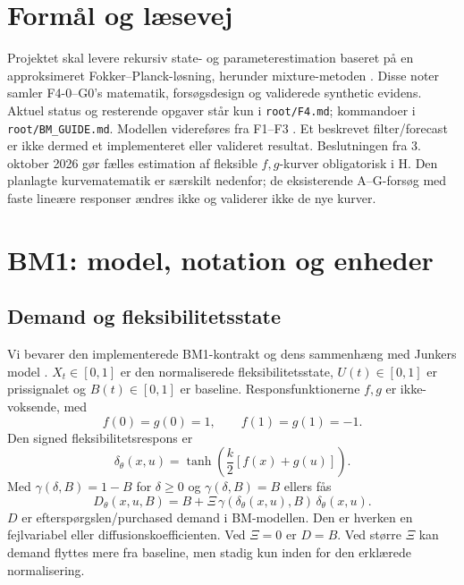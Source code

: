 \section{Formål og læsevej}
Projektet skal levere rekursiv state- og parameterestimation baseret på en
approksimeret Fokker--Planck-løsning, herunder mixture-metoden \cite{project}.
Disse noter samler F4-0--G0's matematik, forsøgsdesign og validerede synthetic evidens. Aktuel status og
resterende opgaver står kun i \texttt{root/F4.md}; kommandoer i \texttt{root/BM\_GUIDE.md}.
Modellen videreføres fra F1--F3 \cite{repo,junker}. Et beskrevet filter/forecast er
ikke dermed et implementeret eller valideret resultat.
Beslutningen fra 3. oktober 2026 gør fælles estimation af fleksible \(f,g\)-kurver
obligatorisk i H. Den planlagte kurvematematik er særskilt nedenfor; de eksisterende
A--G-forsøg med faste lineære responser ændres ikke og validerer ikke de nye kurver.

\section{BM1: model, notation og enheder}
\subsection{Demand og fleksibilitetsstate}
Vi bevarer den implementerede BM1-kontrakt og dens sammenhæng med Junkers model \cite{repo,junker}. \(X_t\in[0,1]\) er den normaliserede fleksibilitetsstate, \(U(t)\in[0,1]\) er prissignalet og \(B(t)\in[0,1]\) er baseline. Responsfunktionerne \(f,g\) er ikke-voksende, med
\begin{equation}
 f(0)=g(0)=1,\qquad f(1)=g(1)=-1.
 \label{eq:endpoints}
\end{equation}
Den signed fleksibilitetsrespons er
\begin{equation}
 \delta_\theta(x,u)=\tanh\!\left(\frac{k}{2}[f(x)+g(u)]\right).
 \label{eq:delta}
\end{equation}
Med \(\gamma(\delta,B)=1-B\) for \(\delta\geq0\) og \(\gamma(\delta,B)=B\) ellers fås
\begin{equation}
 D_\theta(x,u,B)=B+\Xi\,\gamma(\delta_\theta(x,u),B)\,\delta_\theta(x,u).
 \label{eq:demand}
\end{equation}
\(D\) er efterspørgslen/purchased demand i BM-modellen. Den er hverken en fejlvariabel eller diffusionskoefficienten. Ved \(\Xi=0\) er \(D=B\). Ved større \(\Xi\) kan demand flyttes mere fra baseline, men stadig kun inden for den erklærede normalisering.


